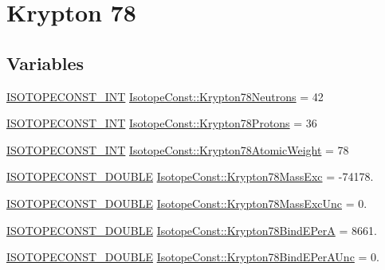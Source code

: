 \hypertarget{group___isotope_const-_krypton-_kr78}{}\section{Krypton 78}
\label{group___isotope_const-_krypton-_kr78}
\subsection*{Variables}
\begin{DoxyCompactItemize}
\item 
\mbox{\hyperlink{group___isotope_const-_macros_ga5f18360b3e99483a35c32d789e62621c}{I\+S\+O\+T\+O\+P\+E\+C\+O\+N\+S\+T\+\_\+\+I\+NT}} \mbox{\hyperlink{group___isotope_const-_krypton-_kr78_gafcdc107b6460f565f6d35a0d9401c59d}{Isotope\+Const\+::\+Krypton78\+Neutrons}} = 42
\item 
\mbox{\hyperlink{group___isotope_const-_macros_ga5f18360b3e99483a35c32d789e62621c}{I\+S\+O\+T\+O\+P\+E\+C\+O\+N\+S\+T\+\_\+\+I\+NT}} \mbox{\hyperlink{group___isotope_const-_krypton-_kr78_ga8924008b6abe9631e8ab23bd98ee031e}{Isotope\+Const\+::\+Krypton78\+Protons}} = 36
\item 
\mbox{\hyperlink{group___isotope_const-_macros_ga5f18360b3e99483a35c32d789e62621c}{I\+S\+O\+T\+O\+P\+E\+C\+O\+N\+S\+T\+\_\+\+I\+NT}} \mbox{\hyperlink{group___isotope_const-_krypton-_kr78_ga4881960e5bccb14870ba0108bfbe83ea}{Isotope\+Const\+::\+Krypton78\+Atomic\+Weight}} = 78
\item 
\mbox{\hyperlink{group___isotope_const-_macros_ga8f45a7272ce02c0b4c65c44636ed719a}{I\+S\+O\+T\+O\+P\+E\+C\+O\+N\+S\+T\+\_\+\+D\+O\+U\+B\+LE}} \mbox{\hyperlink{group___isotope_const-_krypton-_kr78_gadaa8a09b24a22fd688ae5db93b627695}{Isotope\+Const\+::\+Krypton78\+Mass\+Exc}} = -\/74178.
\item 
\mbox{\hyperlink{group___isotope_const-_macros_ga8f45a7272ce02c0b4c65c44636ed719a}{I\+S\+O\+T\+O\+P\+E\+C\+O\+N\+S\+T\+\_\+\+D\+O\+U\+B\+LE}} \mbox{\hyperlink{group___isotope_const-_krypton-_kr78_ga22d518fd6503c6df3ce0cb87b3fb03a9}{Isotope\+Const\+::\+Krypton78\+Mass\+Exc\+Unc}} = 0.
\item 
\mbox{\hyperlink{group___isotope_const-_macros_ga8f45a7272ce02c0b4c65c44636ed719a}{I\+S\+O\+T\+O\+P\+E\+C\+O\+N\+S\+T\+\_\+\+D\+O\+U\+B\+LE}} \mbox{\hyperlink{group___isotope_const-_krypton-_kr78_ga6bda6a9d76d53fd544d089b079a7db01}{Isotope\+Const\+::\+Krypton78\+Bind\+E\+PerA}} = 8661.
\item 
\mbox{\hyperlink{group___isotope_const-_macros_ga8f45a7272ce02c0b4c65c44636ed719a}{I\+S\+O\+T\+O\+P\+E\+C\+O\+N\+S\+T\+\_\+\+D\+O\+U\+B\+LE}} \mbox{\hyperlink{group___isotope_const-_krypton-_kr78_ga77c75f8d811edb30d5129c1f2039f1a7}{Isotope\+Const\+::\+Krypton78\+Bind\+E\+Per\+A\+Unc}} = 0.

\end{DoxyCompactItemize}
